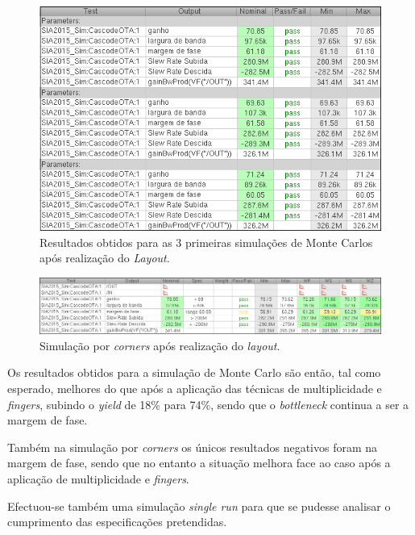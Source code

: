 \documentclass[11pt]{article}
\numberwithin{equation}{section}
\begin{document}
\begin{figure}[H]
	\centering
	\includegraphics[keepaspectratio=true, scale=0.50]{exps/MonteCarlo_3pt_Novo_MultiTransistor_Layout}
	\vspace{-0.5em}
	\caption{Resultados obtidos para as 3 primeiras simulações de Monte Carlos após realização do \textit{Layout}.}
	\vspace{-0.8em} 
\end{figure}

\begin{figure}[H]
	\centering
	\includegraphics[keepaspectratio=true, scale=0.50]{exps/Corners_Novo_Layout}
	\vspace{-0.5em}
	\caption{Simulação por \textit{corners} após realização do \textit{layout}.}
	\vspace{-0.8em} 
\end{figure}

Os resultados obtidos para a simulação de Monte Carlo são então, tal como esperado, melhores do que após a aplicação das técnicas de multiplicidade e \textit{fingers}, subindo o \textit{yield} de 18\% para 74\%, sendo que o \textit{bottleneck} continua a ser a margem de fase.

Também na simulação por \textit{corners} os únicos resultados negativos foram na margem de fase, sendo que no entanto a situação melhora face ao caso após  a aplicação de multiplicidade e \textit{fingers}.

Efectuou-se também uma simulação \textit{single run} para que se pudesse analisar o cumprimento das especificações pretendidas.
\end{document}
